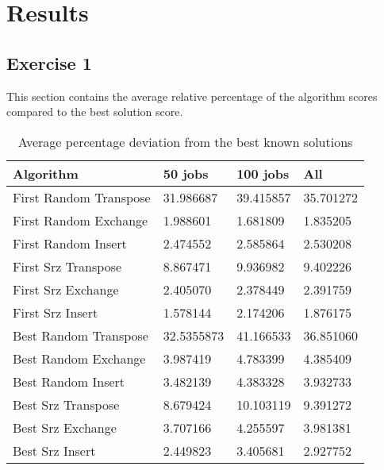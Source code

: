 \documentclass[]{article}
\begin{document}
	
	
	
	\section{Results}
	
	\subsection{Exercise 1}
	This section contains the average relative percentage of the algorithm scores compared to the best solution score.
	\begin{table}[H]
		\centering
		\caption{Average percentage deviation from the best known solutions}
		\label{tab:table1}
		\begin{tabular}{l{|}lll}
			\toprule
			Algorithm & 50 jobs & 100 jobs & All\\
			\midrule
			First Random Transpose &31.986687&39.415857&35.701272\\
			First Random Exchange & 1.988601&1.681809&1.835205\\
			First Random Insert &2.474552&2.585864&2.530208\\
			First Srz Transpose &8.867471&9.936982&9.402226\\
			First Srz Exchange &2.405070& 2.378449&2.391759\\
			First Srz Insert &1.578144 &2.174206&1.876175\\
			Best Random Transpose &32.5355873&41.166533&36.851060\\
			Best Random Exchange & 3.987419&4.783399& 4.385409\\
			Best Random Insert &3.482139& 4.383328&3.932733 \\
			Best Srz Transpose &8.679424&10.103119&9.391272\\
			Best Srz Exchange &3.707166& 4.255597&3.981381 \\
			Best Srz Insert &2.449823&3.405681&2.927752\\
			\bottomrule
		\end{tabular}
	\end{table}
	
	
	
\end{document}
